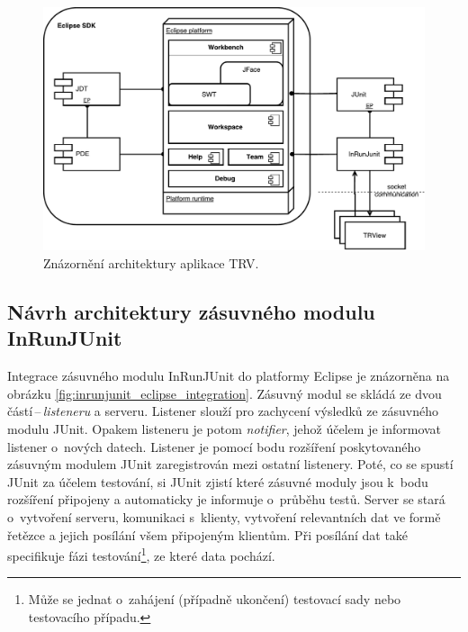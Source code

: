   \begin{figure}
    \includegraphics[width=\textwidth, center]{obrazky-figures/TRV_architecture.pdf}
    \caption{Znázornění architektury aplikace TRV.}
    \label{fig:TRV_architecture}
  \end{figure}

    \subsection{Návrh architektury zásuvného modulu InRunJUnit}
    Integrace zásuvného modulu InRunJUnit do platformy Eclipse je znázorněna na obrázku \ref{fig:inrunjunit_eclipse_integration}. Zásuvný modul se skládá ze dvou částí\,--\,\emph{listeneru} a serveru. Listener slouží pro zachycení výsledků ze zásuvného modulu JUnit. Opakem listeneru je potom \emph{notifier}, jehož účelem je informovat listener o~nových datech. Listener je pomocí bodu rozšíření poskytovaného zásuvným modulem JUnit zaregistrován mezi ostatní listenery. Poté, co se spustí JUnit za účelem testování, si JUnit zjistí které zásuvné moduly jsou k~bodu rozšíření připojeny a automaticky je informuje o~průběhu testů. Server se stará o~vytvoření serveru, komunikaci s~klienty, vytvoření relevantních dat ve formě řetězce a jejich posílání všem připojeným klientům. Při posílání dat také specifikuje fázi testování\footnote{Může se jednat o~zahájení (případně ukončení) testovací sady nebo testovacího případu.}, ze které data pochází.

